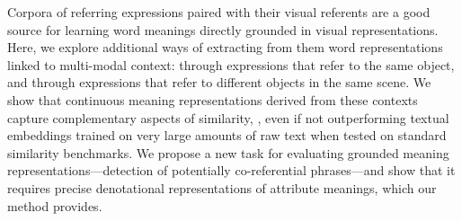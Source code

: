 Corpora of referring expressions paired with their visual referents are a good source for learning word meanings directly grounded in visual representations. Here, we explore additional ways of extracting from them word representations linked to  multi-modal context: through expressions that refer to the same object, and through expressions that refer to different objects in the same scene. We show that continuous meaning representations derived from these contexts capture complementary aspects of similarity, , even if not outperforming textual embeddings trained on very large amounts of raw text when tested on standard similarity benchmarks. We propose a new task for evaluating grounded meaning representations---detection of potentially co-referential phrases---and show that it requires precise denotational representations of attribute meanings, which our method provides.
